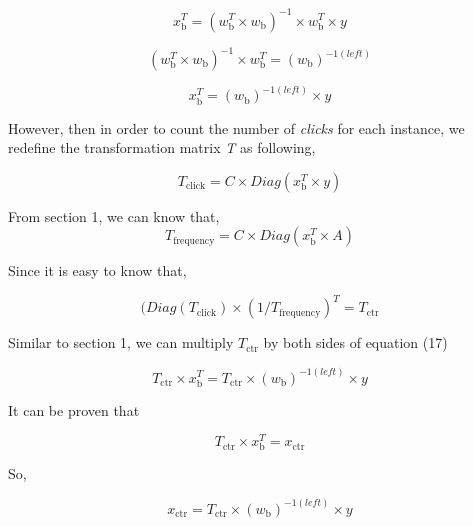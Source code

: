 \begin{equation}
x_{\text{b}}^T = (w_{\text{b}}^T \times w_{\text{b}})^{-1} \times w_{\text{b}}^T \times y 
\end{equation}

\begin{equation}
(w_{\text{b}}^T \times w_{\text{b}})^{-1} \times w_{\text{b}}^T = (w_{\text{b}})^{-1(left)}  
\end{equation}

\begin{equation}
x_{\text{b}}^T =  (w_{\text{b}})^{-1(left)} \times y 
\end{equation}

However, then in order to count the number of \textsl{clicks} for each instance, we redefine the transformation matrix \textsl{T} as following, 

\begin{equation}
T_{\text{click}} = C \times Diag(x_{\text{b}}^T \times y)
\end{equation}



From section 1, we can know that, 
\begin{equation}
T_{\text{frequency}} = C \times Diag(x_{\text{b}}^T \times A)
\end{equation}

Since it is easy to know that,

\begin{equation}
(Diag(T_{\text{click}}) \times (1/T_{\text{frequency}} )^T =  T_{\text{ctr}}
\end{equation}

Similar to section 1, we can multiply \(T_{\text{ctr}}\) by both sides of equation (17)

\begin{equation}
T_{\text{ctr}} \times x_{\text{b}}^T =  T_{\text{ctr}} \times (w_{\text{b}})^{-1(left)} \times y 
\end{equation}

It can be proven that 

\begin{equation}
T_{\text{ctr}} \times x_{\text{b}}^T =  x_{\text{ctr}}
\end{equation}

So,

\begin{equation}
 x_{\text{ctr}} =  T_{\text{ctr}} \times (w_{\text{b}})^{-1(left)} \times y 
\end{equation}


